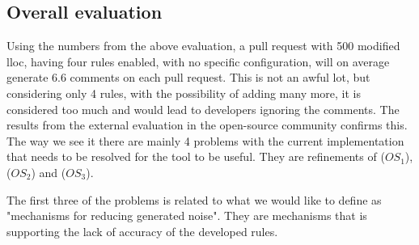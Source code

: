 \documentclass{report}
\begin{document}

\subsection{Overall evaluation}
\label{evaluation-overall}

Using the numbers from the above evaluation, a pull request with 500 modified \gls{lloc}, having four rules enabled, with no specific configuration, will on average generate 6.6 comments on each pull request. This is not an awful lot, but considering only 4 rules, with the possibility of adding many more, it is considered too much and would lead to developers ignoring the comments. The results from the external evaluation in the open-source community confirms this. The way we see it there are mainly 4 problems with the current implementation that needs to be resolved for the tool to be useful. They are refinements of (\(OS_{1}\)), (\(OS_{2}\)) and (\(OS_{3}\)). 

The first three of the problems is related to what we would like to define as "mechanisms for reducing generated noise". They are mechanisms that is supporting the lack of accuracy of the developed rules.
\end{document}
